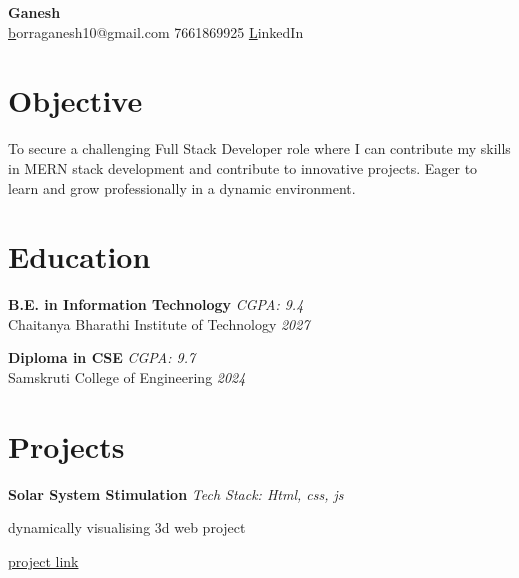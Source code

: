 \documentclass[a4paper,10pt]{article}
\begin{document}
\begin{center}
    {\huge \textbf{ Ganesh }} \\
    \vspace{5pt}
    \small \href{mailto:borraganesh10@gmail.com } borraganesh10@gmail.com \quad \textbullet{} 7661869925     
    \quad \textbullet{} \href{ https://www.linkedin.com/in/ganesh10-/ }LinkedIn 
  
\end{center}

    
\section*{Objective}
\noindent
To secure a challenging Full Stack Developer role where I can contribute my skills in MERN stack development and contribute to innovative projects.  Eager to learn and grow professionally in a dynamic environment.
\vspace{0.3cm}


\section*{Education}

\noindent
\textbf{ B.E. in Information Technology } \hfill  \textit{ CGPA: 9.4 } \\
Chaitanya Bharathi Institute of Technology  \hfill  \textit{ 2027 } 
\vspace{0.3cm}

\noindent
\textbf{ Diploma in CSE } \hfill  \textit{ CGPA: 9.7 } \\
Samskruti College of Engineering  \hfill  \textit{ 2024 } 
\vspace{0.3cm}



\section*{Projects}
\noindent
\begin{compactitem}
    
        \item\textbf{ Solar System Stimulation } \hfill \textit{ Tech Stack: Html, css, js } 
        \begin{compactitem}
            
            \item dynamically visualising 3d web project
            
        \end{compactitem}
        \href{  }{project link}
    
\end{compactitem}
\end{document}
